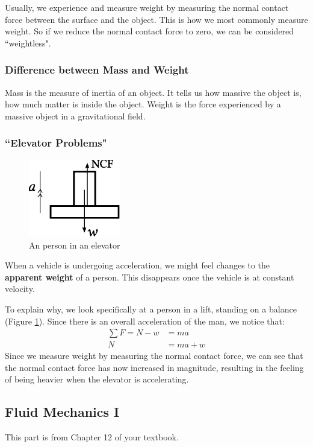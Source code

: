 \documentclass[11pt]{article}
\numberwithin{equation}{section}
\begin{document}
		Usually, we experience and measure weight by measuring the normal contact force between the surface and the object. This is how we most commonly measure weight. So if we reduce the normal contact force to zero, we can be considered ``weightless".
			\subsubsection{Difference between Mass and Weight}
			Mass is the measure of inertia of an object. It tells us how massive the object is, how much matter is inside the object. Weight is the force experienced by a massive object in a gravitational field. 
			\subsubsection{``Elevator Problems"}
			\begin{figure}
				\centering
				\vspace{-0.7cm}
				\includegraphics[width=4cm]{elevator.eps}
				\caption{An person in an elevator}
				\label{fig:elevator}
				\vspace{-0.7cm}
			\end{figure}

			When a vehicle is undergoing acceleration, we might feel changes to the \textbf{apparent weight} of a person. This disappears once the vehicle is at constant velocity. 

			To explain why, we look specifically at a person in a lift, standing on a balance (Figure \ref{fig:elevator}). Since there is an overall acceleration of the man, we notice that:
			\begin{align*}
				\sum F = N - w &= ma \\
				N &= ma + w 
			\end{align*}
			Since we measure weight by measuring the normal contact force, we can see that the normal contact force has now increased in magnitude, resulting in the feeling of being heavier when the elevator is accelerating.

		\pagebreak
		\subsection{Fluid Mechanics I}
			This part is from Chapter 12 of your textbook. 
			\vspace{-0.3cm}
\end{document}

